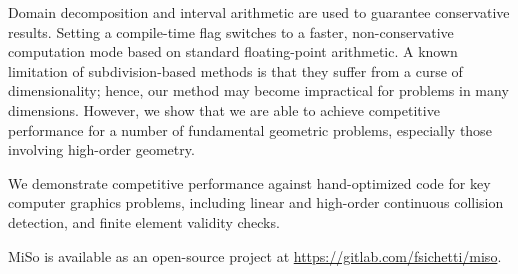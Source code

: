 Domain decomposition and interval arithmetic are used to guarantee conservative results. Setting a compile-time flag switches to a faster, non-conservative computation mode based on standard floating-point arithmetic.
A known limitation of subdivision-based methods is that they suffer from a curse of dimensionality; hence, our method may become impractical for problems in many dimensions. However, we show that we are able to achieve competitive performance for a number of fundamental geometric problems, especially those involving high-order geometry.

We demonstrate competitive performance against hand-optimized code for key computer graphics problems, including linear and high-order continuous collision detection, and finite element validity checks.

MiSo is available as an open-source project at \url{https://gitlab.com/fsichetti/miso}.

